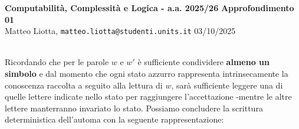 \documentclass[a4paper,10pt]{article}
\newcommand{\EsercitazioneNum}{01}
\newcommand{\Data}{03/10/2025}
\begin{document}
   \vfill
    \noindent\makebox[\linewidth]{\rule{\linewidth}{0.4pt}}
    \newpage
    {\noindent
    \small \textbf{Computabilità, Complessità e Logica - a.a. 2025/26} \hfill \textbf{Approfondimento \EsercitazioneNum} \\[0.2cm]
    \scriptsize Matteo Liotta, \texttt{matteo.liotta@studenti.units.it} \hfill \Data \\[0.2cm]
    \noindent\makebox[\linewidth]{\rule{\linewidth}{0.4pt}} \\[0.3cm]}



Ricordando che per le parole $w$ e $w'$ è sufficiente condividere \textbf{almeno un simbolo} e dal momento che ogni stato azzurro rappresenta intrinsecamente la conoscenza raccolta a seguito alla lettura di $w$, sarà sufficiente leggere una di quelle lettere indicate nello stato per raggiungere l'accettazione -mentre le altre lettere manterranno invariato lo stato. Possiamo concludere la scrittura deterministica dell'automa con la seguente rappresentazione:
\end{document}
